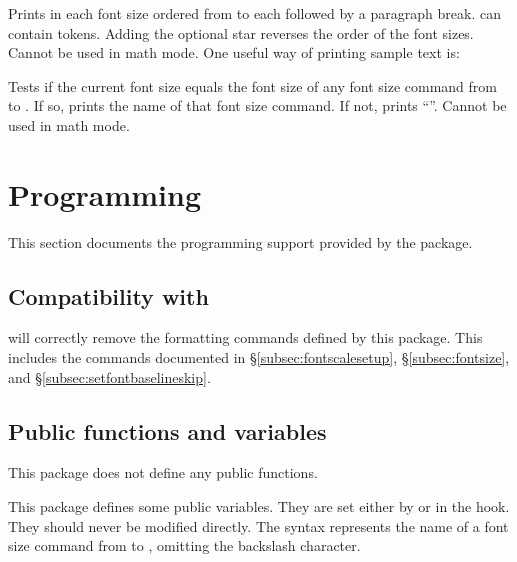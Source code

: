 \documentclass{beery}
\begin{document}
Prints  in each font size ordered from  to  each followed by a paragraph break.
 can contain  tokens.
Adding the optional star \sarg{} reverses the order of the font sizes.
Cannot be used in math mode.
One useful way of printing sample text is:

\begin{verbatim*}
\printsampletext{\printfontsizecommand: \printfontsizeparameters}
\end{verbatim*}

\begin{displaycode}
\end{displaycode}

Tests if the current font size equals the font size of any font size command from  to .
If so, prints the name of that font size command.
If not, prints \enquote{\string\undefined}.
Cannot be used in math mode.


\section{Programming}
\label{sec:programming}

This section documents the  programming support provided by the  package.

\subsection{Compatibility with }
\label{subsec:textpurify}

 will correctly remove the formatting commands defined by this package.
This includes the commands documented in \S\ref{subsec:fontscalesetup}, \S\ref{subsec:fontsize}, and \S\ref{subsec:setfontbaselineskip}.

\subsection{Public functions and variables}
\label{subsec:publicexpl3}

This package does not define any public  functions.

This package defines some public  variables.
They are set either by  or in the  hook.
They should never be modified directly.
The syntax  represents the name of a font size command from  to , omitting the backslash character.
\end{document}

